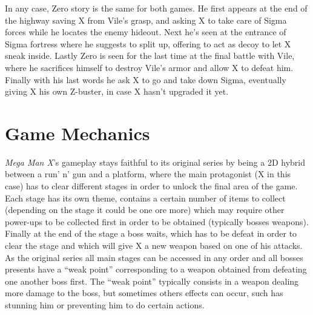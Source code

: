 In any case, Zero story is the same for both games. He first appears at the end of the highway saving X from Vile's grasp, and asking X to take care of Sigma forces while he locates the enemy hideout. Next he's seen at the entrance of Sigma fortress where he suggests to split up, offering to act as decoy to let X sneak inside. Lastly Zero is seen for the last time at the final battle with Vile, where he sacrifices himself to destroy Vile's armor and allow X to defeat him. Finally with his last words he ask X to go and take down Sigma, eventually giving X his own Z-buster, in case X hasn't upgraded it yet.

\section{Game Mechanics}
\textit{Mega Man X}'s gameplay stays faithful to its original series by being a 2D hybrid between a run' n' gun and a platform, where the main protagonist (X in this case) has to clear different stages in order to unlock the final area of the game. Each stage has its own theme, contains a certain number of items to collect (depending on the stage it could be one ore more) which may require other power-ups to be collected first in order to be obtained (typically bosses weapons). Finally at the end of the stage a boss waits, which has to be defeat in order to clear the stage and which will give X a new weapon based on one of his attacks. As the original series all main stages can be accessed in any order and all bosses presents have a ``weak point'' corresponding to a weapon obtained from defeating one another boss first. The ``weak point'' typically consists in a weapon dealing more damage to the boss, but sometimes others effects can occur, such has stunning him or preventing him to do certain actions.

